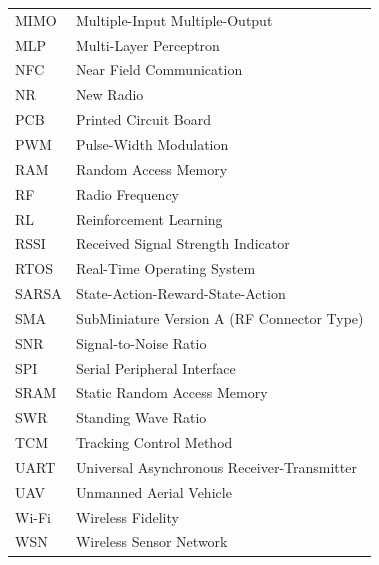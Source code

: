 \begin{longtable}{@{}p{5cm} p{11cm}}
MIMO      & Multiple-Input Multiple-Output \\[0.2cm]
MLP       & Multi-Layer Perceptron \\[0.2cm]
NFC       & Near Field Communication \\[0.2cm]
NR        & New Radio \\[0.2cm]
PCB       & Printed Circuit Board \\[0.2cm]
PWM       & Pulse-Width Modulation \\[0.2cm]
RAM       & Random Access Memory \\[0.2cm]
RF        & Radio Frequency \\[0.2cm]
RL        & Reinforcement Learning \\[0.2cm]
RSSI      & Received Signal Strength Indicator \\[0.2cm]
RTOS      & Real-Time Operating System \\[0.2cm]
SARSA     & State-Action-Reward-State-Action \\[0.2cm]
SMA       & SubMiniature Version A (RF Connector Type) \\[0.2cm]
SNR       & Signal-to-Noise Ratio \\[0.2cm]
SPI       & Serial Peripheral Interface \\[0.2cm]
SRAM      & Static Random Access Memory \\[0.2cm]
SWR       & Standing Wave Ratio \\[0.2cm]
TCM       & Tracking Control Method \\[0.2cm]
UART      & Universal Asynchronous Receiver-Transmitter \\[0.2cm]
UAV       & Unmanned Aerial Vehicle \\[0.2cm]
Wi-Fi     & Wireless Fidelity \\[0.2cm]
WSN       & Wireless Sensor Network \\[0.2cm]
\end{longtable}
